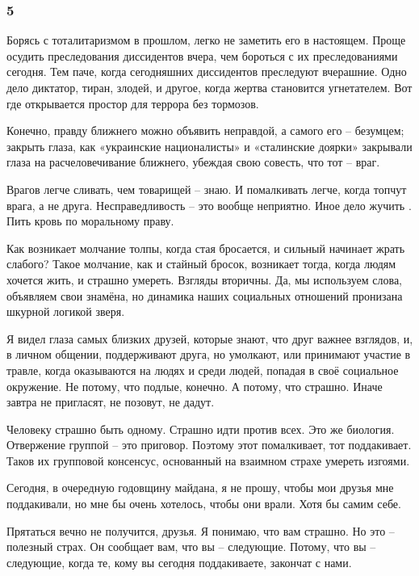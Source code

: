  
 
 
 
 
\subsubsection{5}

Борясь с тоталитаризмом в прошлом, легко не заметить его в настоящем. Проще
осудить преследования диссидентов вчера, чем бороться с их преследованиями
сегодня. Тем паче, когда сегодняшних диссидентов преследуют вчерашние. Одно
дело диктатор, тиран, злодей, и другое, когда жертва становится угнетателем.
Вот где открывается простор для террора без тормозов.

Конечно, правду ближнего можно объявить неправдой, а самого его – безумцем;
закрыть глаза, как «украинские националисты» и «сталинские доярки» закрывали
глаза на расчеловечивание ближнего, убеждая свою совесть, что тот – враг. 

Врагов легче сливать, чем товарищей – знаю. И помалкивать легче, когда топчут
врага, а не друга. Несправедливость – это вообще неприятно. Иное дело жучить
. Пить  кровь по моральному праву.

Как возникает молчание толпы, когда стая бросается, и сильный начинает жрать
слабого? Такое молчание, как и стайный бросок, возникает тогда, когда людям
хочется жить, и страшно умереть. Взгляды вторичны. Да, мы используем слова,
объявляем свои знамёна, но динамика наших социальных отношений пронизана
шкурной логикой зверя. 

Я видел глаза самых близких друзей, которые знают, что друг важнее взглядов, и,
в личном общении, поддерживают друга, но умолкают, или принимают участие в
травле, когда оказываются на людях и среди людей, попадая в своё социальное
окружение. Не потому, что подлые, конечно. А потому, что страшно. Иначе завтра
не пригласят, не позовут, не дадут. 

Человеку страшно быть одному. Страшно идти против всех. Это же биология.
Отвержение группой – это приговор. Поэтому этот помалкивает, тот поддакивает.
Таков их групповой консенсус, основанный на взаимном страхе умереть изгоями.

Сегодня, в очередную годовщину майдана, я не прошу, чтобы мои друзья мне
поддакивали, но мне бы очень хотелось, чтобы они врали. Хотя бы самим себе.

Прятаться вечно не получится, друзья. Я понимаю, что вам страшно. Но это –
полезный страх. Он сообщает вам, что вы – следующие. Потому, что вы –
следующие, когда те, кому вы сегодня поддакиваете, закончат с нами.
